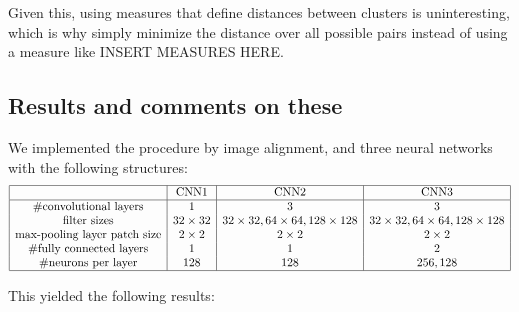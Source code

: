 \documentclass{article}
\theoremstyle{definition}
\theoremstyle{remark}
\theoremstyle{proposition}
\begin{document}
            Given this, using measures that define distances between clusters is uninteresting, which is why simply minimize the distance over all possible pairs instead of using a measure like INSERT MEASURES HERE.

            \subsection{Results and comments on these}
            \label{code_results}

            We implemented the procedure by image alignment, and three neural networks with the following structures:
            \[
                \begin{array}{|c|c|c|c|}
                    \hline
                    & \text{CNN}1 & \text{CNN}2 & \text{CNN}3 \\
                    \hline
                    \# \text{convolutional layers} & 1 & 3 & 3 \\
                    \text{filter sizes} & 32\times32 & 32\times32, 64\times64, 128\times128 & 32\times32, 64\times64, 128\times128 \\
                    \text{max-pooling layer patch size} & 2 \times 2 & 2\times2 & 2\times2 \\
                    \# \text{fully connected layers} & 1 & 1 & 2 \\
                    \# \text{neurons per layer} & 128 & 128 & 256,128 \\
                    \hline
                \end{array}
            \]

            This yielded the following results:
\end{document}
